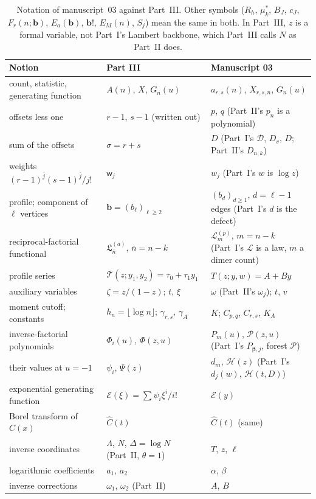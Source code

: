 \documentclass[11pt]{article}
\numberwithin{equation}{section}
\theoremstyle{definition}
\theoremstyle{remark}
\theoremstyle{definition}
\newcommand{\rise}[2]{{#1}^{\overline{#2}}}
\newcommand{\bfac}{\mathbf b!}
\newcommand{\rcw}{\mathsf w}
\begin{document}
\begin{table}[htbp]
\centering\small
\renewcommand{\arraystretch}{1.12}
\begin{tabular}{@{}>{\raggedright\arraybackslash}p{}>{\raggedright\arraybackslash}p{}>{\raggedright\arraybackslash}p{}@{}}
\toprule
Notion & Part III & Manuscript 03\\
\midrule
count, statistic, generating function & $A(n)$, $X$, $G_n(u)$ & $a_{r,s}(n)$, $X_{r,s,n}$, $G_n(u)$\\
offsets less one & $r-1$, $s-1$ (written out) & $p$, $q$ (Part~II's $p_n$ is a polynomial)\\
sum of the offsets & $\sigma=r+s$ & $D$ (Part~I's $\mathcal D$, $D_v$, $D$; Part~II's $D_{n,k}$)\\
weights $\rise{(r-1)}j\rise{(s-1)}j/j!$ & $\rcw_j$ & $w_j$ (Part~I's $w$ is $\log z$)\\
profile; component of $\ell$ vertices & $\mathbf b=(b_\ell)_{\ell\ge2}$ & $(b_d)_{d\ge1}$, $d=\ell-1$ edges (Part~I's $d$ is the defect)\\
reciprocal-factorial functional & $\mathfrak L_{\bar n}^{(a)}$, $\bar n=n-k$ & $\mathcal L_m^{(p)}$, $m=n-k$ (Part~I's $\mathcal L$ is a law, $m$ a dimer count)\\
profile series & $\mathcal T(z;y_1,y_2)=\tau_0+\tau_1y_1$ & $T(z;y,w)=A+By$\\
auxiliary variables & $\zeta=z/(1-z)$; $t$, $\xi$ & $\omega$ (Part~II's $\omega_j$); $t$, $v$\\
moment cutoff; constants & $h_n=\lfloor\log n\rfloor$; $\gamma_{r,s}$, $\gamma_A$ & $K$; $C_{p,q}$, $C_{r,s}$, $K_A$\\
inverse-factorial polynomials & $\Phi_i(u)$, $\Phi(z,u)$ & $P_m(u)$, $\mathcal P(z,u)$ (Part~I's $P_{\boldsymbol\beta,j}$, forest $\mathcal P$)\\
their values at $u=-1$ & $\psi_i$, $\Psi(z)$ & $d_m$, $\mathcal H(z)$ (Part~I's $d_j(w)$, $\mathcal H(t,D)$)\\
exponential generating function & $\mathcal E(\xi)=\sum\psi_i\xi^i/i!$ & $\mathcal E(y)$\\
Borel transform of $C(x)$ & $\widehat C(t)$ & $\widehat C(t)$ (same)\\
inverse coordinates & $\Lambda$, $N$, $\Delta=\log N$ (Part~II, $\theta=1$) & $T$, $z$, $\ell$\\
logarithmic coefficients & $a_1$, $a_2$ & $\alpha$, $\beta$\\
inverse corrections & $\omega_1$, $\omega_2$ (Part~II) & $A$, $B$\\
\bottomrule
\end{tabular}
\caption{Notation of manuscript~03 against Part~III. Other symbols ($R_h$,
$\mu_k^*$, $B_J$, $c_J$, $F_r(n;\mathbf b)$, $E_a(\mathbf b)$, $\bfac$,
$E_M(n)$, $S_j$) mean the same in both. In Part~III, $z$ is a formal
variable, not Part~I's Lambert backbone, which Part~III calls $N$ as
Part~II does.}
\label{spf:rc:tab:dictionary}
\end{table}
\end{document}
